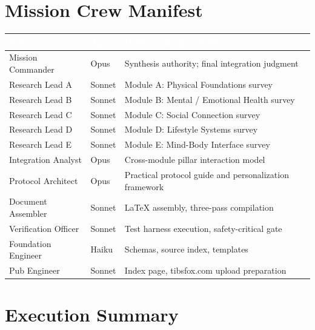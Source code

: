 \documentclass[11pt,letterpaper]{article}
\newcommand{\tableheader}[1]{\textbf{\sffamily\textcolor{white}{#1}}}
\begin{document}
\section{Mission Crew Manifest}

\begin{center}
\begin{tabularx}{\textwidth}{L{3.5cm}C{1.5cm}X}
\toprule
{}
\tableheader{Role} & \tableheader{Agent} & \tableheader{Primary Responsibility} \\
\midrule
Mission Commander & Opus & Synthesis authority; final integration judgment \\
Research Lead A & Sonnet & Module A: Physical Foundations survey \\
Research Lead B & Sonnet & Module B: Mental / Emotional Health survey \\
Research Lead C & Sonnet & Module C: Social Connection survey \\
Research Lead D & Sonnet & Module D: Lifestyle Systems survey \\
Research Lead E & Sonnet & Module E: Mind-Body Interface survey \\
Integration Analyst & Opus & Cross-module pillar interaction model \\
Protocol Architect & Opus & Practical protocol guide and personalization framework \\
Document Assembler & Sonnet & LaTeX assembly, three-pass compilation \\
Verification Officer & Sonnet & Test harness execution, safety-critical gate \\
Foundation Engineer & Haiku & Schemas, source index, templates \\
Pub Engineer & Sonnet & Index page, tibsfox.com upload preparation \\
\bottomrule
\end{tabularx}
\end{center}

\section{Execution Summary}
\end{document}
